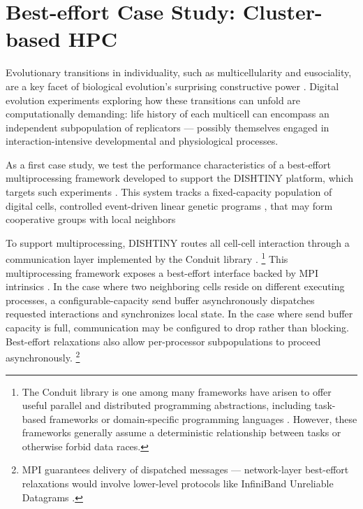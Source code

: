 \section{Best-effort Case Study: Cluster-based HPC} \label{moreno:sec:case1}



Evolutionary transitions in individuality, such as multicellularity and eusociality, are a key facet of biological evolution's surprising constructive power \cite{taylor2016open}.
Digital evolution experiments exploring how these transitions can unfold are computationally demanding: life history of each multicell can encompass an independent subpopulation of replicators --- possibly themselves engaged in interaction-intensive developmental and physiological processes.

As a first case study, we test the performance characteristics of a best-effort multiprocessing framework developed to support the DISHTINY platform, which targets such experiments \cite{moreno2019toward}.
This system tracks a fixed-capacity population of digital cells, controlled event-driven linear genetic programs \cite{lalejini2018evolving}, that may form cooperative groups with local neighbors \cite{moreno2021exploring}

To support multiprocessing, DISHTINY routes all cell-cell interaction through a communication layer implemented by the Conduit library \cite{moreno2021conduit}.
\unskip\footnote{%
The Conduit library is one among many frameworks have arisen to offer useful parallel and distributed programming abstractions, including task-based frameworks \cite{kale1993charm++,bauer2012legion,blumofe1996cilk,reinders2007intel} or domain-specific programming languages \cite{el2006upc,chamberlain2007parallel}.
However, these frameworks generally assume a deterministic relationship between tasks or otherwise forbid data races.
}
This multiprocessing framework exposes a best-effort interface backed by MPI intrinsics \cite{gropp1996high}.
In the case where two neighboring cells reside on different executing processes, a configurable-capacity send buffer asynchronously dispatches requested interactions and synchronizes local state.
In the case where send buffer capacity is full, communication may be configured to drop rather than blocking.
Best-effort relaxations also allow per-processor subpopulations to proceed asynchronously.
\unskip\footnote{%
MPI guarantees delivery of dispatched messages --- network-layer best-effort relaxations would involve lower-level protocols like InfiniBand Unreliable Datagrams \cite{kashyap2006ip,koop2007high}.
}

